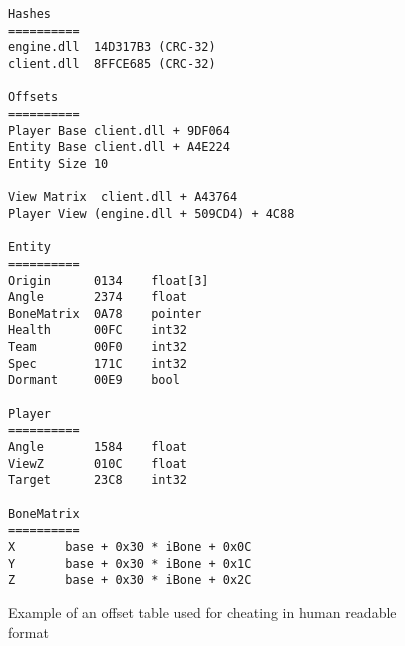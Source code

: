 \begin{figure}[!htbp]
\begin{verbatim}
Hashes
==========
engine.dll	14D317B3 (CRC-32)
client.dll	8FFCE685 (CRC-32)
 
Offsets
==========
Player Base	client.dll + 9DF064
Entity Base	client.dll + A4E224
Entity Size	10
 
View Matrix	 client.dll + A43764
Player View	(engine.dll + 509CD4) + 4C88
 
Entity
==========
Origin		0134	float[3]
Angle		2374	float
BoneMatrix	0A78	pointer
Health		00FC	int32
Team		00F0	int32
Spec		171C	int32
Dormant		00E9	bool
 
Player
==========
Angle		1584	float
ViewZ		010C	float
Target		23C8	int32
 
BoneMatrix
==========
X		base + 0x30 * iBone + 0x0C
Y		base + 0x30 * iBone + 0x1C
Z		base + 0x30 * iBone + 0x2C
\end{verbatim}
\caption{Example of an offset table used for cheating in human readable format \cite{offsets}}
\label{fig:offsets}
\end{figure}